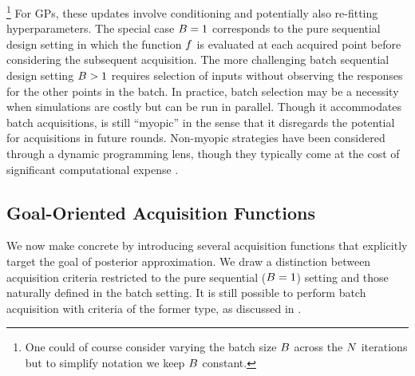\documentclass[12pt]{article}
\begin{document}
\footnote{One could of course consider varying the batch size $B$ across the $N$ iterations but to simplify notation
we keep $B$ constant.}
For GPs, these updates involve conditioning and potentially also re-fitting hyperparameters. 
The special case $B = 1$ corresponds to the 
pure sequential design setting in which the function $f$ is evaluated at each acquired point before
considering the subsequent acquisition. The more challenging batch sequential design setting
$B > 1$ requires selection of inputs without observing the responses for the other points
in the batch. In practice, batch selection may be a necessity when simulations are costly but can 
be run in parallel. Though it accommodates batch acquisitions,  is
still ``myopic'' in the sense that it disregards the potential for acquisitions in future rounds. 
Non-myopic strategies have been considered
through a dynamic programming lens, though they typically come at the cost of significant 
computational expense \citep{SURThesis, supermartingaleSUR}.

\subsection{Goal-Oriented Acquisition Functions}
We now make  concrete by introducing several acquisition functions
that explicitly target the goal of posterior approximation. We draw a distinction between 
acquisition criteria restricted to the pure sequential ($B = 1$) setting
and those naturally defined in the batch setting. It is still possible to perform 
batch acquisition with criteria of the former type, as discussed in .
\end{document}
